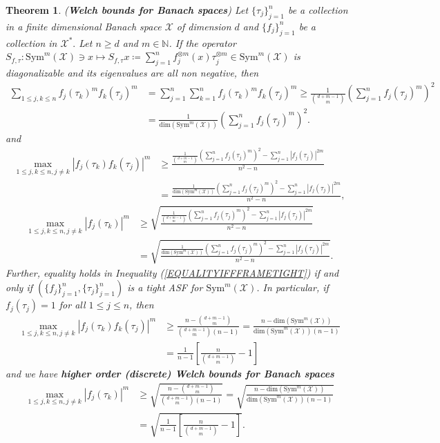 \documentclass{amsart}
\newtheorem{theorem}{Theorem}[section]
\begin{document}
  \begin{theorem}\label{WELCHBANACH}
(\textbf{Welch bounds for Banach spaces})  	Let $\{\tau_j\}_{j=1}^n$ be a collection in a finite dimensional Banach space $\mathcal{X}$ of dimension $d$  and 	$\{f_j\}_{j=1}^n$ be a collection in  $\mathcal{X}^*.$ Let $n\geq d$ and $m\in \mathbb{N}$. If the  operator 
  $	S_{f, \tau}:\text{Sym}^m(\mathcal{X})\ni x \mapsto S_{f, \tau}x\coloneqq \sum_{j=1}^n
  f_j^{\otimes m}(x)\tau_j ^{\otimes m}\in
 \text{Sym}^m(\mathcal{X})$ is diagonalizable and its eigenvalues are all non negative, then 
  \begin{align}\label{EQUALITYIFFFRAMETIGHT}
 \sum_{1\leq j,k \leq n}f_j(\tau_k)^mf_k(\tau_j)^m &=\sum_{j=1}^n\sum_{k=1}^nf_j(\tau_k)^mf_k(\tau_j)^m
 \geq \frac{1}{{d+m-1 \choose m}}	\left(\sum_{j=1}^n
  f_j(\tau_j)^m\right)^2\nonumber \\
  &=\frac{1}{\text{dim}(\text{Sym}^m(\mathcal{X}))}	\left(\sum_{j=1}^n
  f_j(\tau_j)^m\right)^2.
  \end{align}
  and 
  \begin{align*}
  \max _{1\leq j,k \leq n, j\neq k}|f_j(\tau_k)f_k(\tau_j)|^m&\geq \frac{\frac{1}{{d+m-1 \choose m}}	\left(\sum_{j=1}^n
  	f_j(\tau_j)^m\right)^2-	\sum_{j=1}^n
  	|f_j(\tau_j)|^{2m}}{n^2-n}\\
  &=\frac{\frac{1}{\text{dim}(\text{Sym}^m(\mathcal{X}))}	\left(\sum_{j=1}^n
  	f_j(\tau_j)^m\right)^2-	\sum_{j=1}^n
  	|f_j(\tau_j)|^{2m}}{n^2-n},
  \end{align*}
  \begin{align*}
  \max _{1\leq j,k \leq n, j\neq k}|f_j(\tau_k)|^m&\geq \sqrt{\frac{\frac{1}{{d+m-1 \choose m}}	\left(\sum_{j=1}^n
  		f_j(\tau_j)^m\right)^2-	\sum_{j=1}^n
  		|f_j(\tau_j)|^{2m}}{n^2-n}}\\
  	&=\sqrt{\frac{\frac{1}{\text{dim}(\text{Sym}^m(\mathcal{X}))}	\left(\sum_{j=1}^n
  			f_j(\tau_j)^m\right)^2-	\sum_{j=1}^n
  			|f_j(\tau_j)|^{2m}}{n^2-n}}.
  \end{align*}
  Further, equality holds in Inequality (\ref{EQUALITYIFFFRAMETIGHT}) if and only if $ (\{f_j \}_{j=1}^n, \{\tau_j \}_{j=1}^n) $ is a  tight  ASF for $\text{Sym}^m(\mathcal{X})$. 
  In particular, if $f_j(\tau_j)=1$ for all $1\leq j \leq n$, then 
  \begin{align*}
  \max _{1\leq j,k \leq n, j\neq k}|f_j(\tau_k)f_k(\tau_j)|^m&\geq \frac{n-{d+m-1 \choose m}}{{d+m-1 \choose m}(n-1)}=\frac{n-\text{dim}(\text{Sym}^m(\mathcal{X}))}{\text{dim}(\text{Sym}^m(\mathcal{X}))(n-1)}
  \\
  &=\frac{1}{n-1}\left[\frac{n}{{d+m-1\choose m}}-1\right]
  \end{align*}
  and we have \textbf{ higher order (discrete) Welch bounds for Banach spaces}
  \begin{align*}
 \max _{1\leq j,k \leq n, j\neq k}|f_j(\tau_k)|^m&\geq\sqrt{\frac{n-{d+m-1 \choose m}}{{d+m-1 \choose m}(n-1)}}= \sqrt{\frac{n-\text{dim}(\text{Sym}^m(\mathcal{X}))}{\text{dim}(\text{Sym}^m(\mathcal{X}))(n-1)}}\\
 &=\sqrt{\frac{1}{n-1}\left[\frac{n}{{d+m-1\choose m}}-1\right]}.
  \end{align*}	
  \end{theorem}
\end{document}
